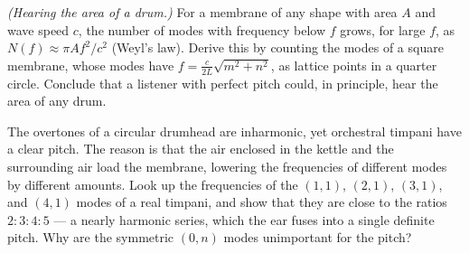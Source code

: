 \begin{problems}
 \label{prob:drum-area} \emph{(Hearing the area of a drum.)} For a membrane of any shape with area $A$ and wave speed $c$, the number of modes with frequency below $f$ grows, for large $f$, as $N(f)\approx\pi Af^2/c^2$ (Weyl's law). Derive this by counting the modes of a square membrane, whose modes have $f = \tfrac{c}{2L}\sqrt{m^2+n^2}$, as lattice points in a quarter circle. Conclude that a listener with perfect pitch could, in principle, hear the area of any drum.

 The overtones of a circular drumhead are inharmonic, yet orchestral timpani have a clear pitch. The reason is that the air enclosed in the kettle and the surrounding air load the membrane, lowering the frequencies of different modes by different amounts. Look up the frequencies of the $(1,1)$, $(2,1)$, $(3,1)$, and $(4,1)$ modes of a real timpani, and show that they are close to the ratios $2:3:4:5$ --- a nearly harmonic series, which the ear fuses into a single definite pitch. Why are the symmetric $(0,n)$ modes unimportant for the pitch?
\end{problems}

\begin{reading}
\end{reading}
